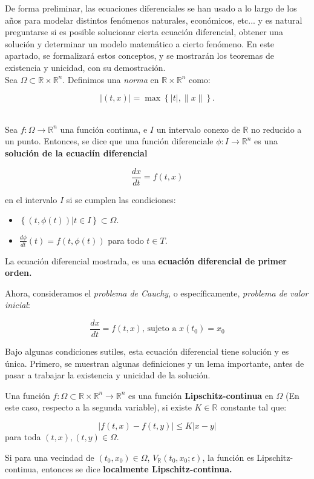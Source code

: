 De forma preliminar, las ecuaciones diferenciales se han usado a lo largo de los años para modelar distintos fenómenos naturales, económicos, etc... y es natural preguntarse si es posible solucionar cierta ecuación diferencial, obtener una solución y determinar un modelo matemático a cierto fenómeno. En este apartado, se formalizará estos conceptos, y se mostrarán los teoremas de existencia y unicidad, con su demostración. \\

Sea $\Omega \subset \mathbb{R} \times \mathbb{R}^n$. Definimos una \textit{norma} en $\mathbb{R} \times \mathbb{R}^n$ como:

\[
	\lvert (t,x) \rvert = \max\left\{ \lvert t \rvert, \lVert x \rVert \right\}.
\] \\

\begin{boxDef}
	Sea $f: \Omega \rightarrow \mathbb{R}^n$ una función continua, e $I$ un intervalo conexo de $\mathbb{R}$ no reducido a un punto. Entonces, se dice que una función diferenciale $\phi: I \rightarrow \mathbb{R}^n$ es una \textbf{solución de la ecuaciín diferencial}

	\[
		\frac{dx}{dt} = f(t, x)
	\]

	en el intervalo $I$ si se cumplen las condiciones:

	\begin{itemize}
		\item $\left\{ (t, \phi(t) ) \vert t \in I  \right\} \subset \Omega$.
		\item $\frac{d\phi}{dt} (t) = f(t, \phi(t))$ para todo $t \in T$. 
	\end{itemize}

	La ecuación diferencial mostrada, es una \textbf{ecuación diferencial de primer orden.}

\end{boxDef}

Ahora, consideramos el \textit{problema de Cauchy}, o específicamente, \textit{problema de valor inicial}:

\[
	\frac{dx}{dt} = f(t, x) \text{, sujeto a } x(t_0) = x_0
\]

Bajo algunas condiciones sutiles, esta ecuación diferencial tiene solución y es única. Primero, se muestran algunas definiciones y un lema importante, antes de pasar a trabajar la existencia y unicidad de la solución.

\begin{boxDef}
	Una función $f: \Omega \subset \mathbb{R} \times \mathbb{R}^n \rightarrow \mathbb{R}^n$ es una función \textbf{Lipschitz-continua} en $\Omega$ (En este caso, respecto a la segunda variable), si existe $K \in \mathbb{R}$ constante tal que:

	\[
		\lvert f(t,x) - f(t,y) \rvert \leq K \lvert x - y \rvert
	\]
	para toda $(t,x), (t,y) \in \Omega$.

	Si para una vecindad de $(t_0, x_0) \in \Omega$, $V_{\mathbb{R}}(t_0, x_0; \epsilon)$, la función es Lipschitz-continua, entonces se dice \textbf{localmente Lipschitz-continua.}

\end{boxDef}

